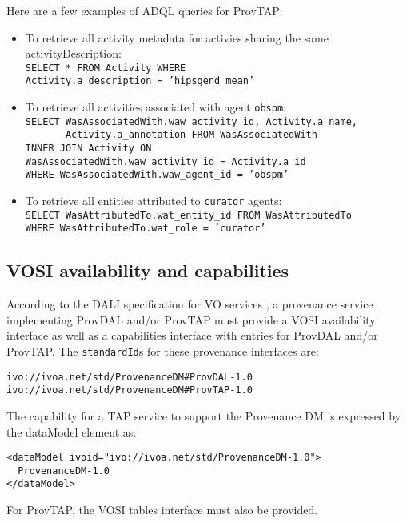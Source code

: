 Here are a few examples of ADQL queries for ProvTAP:
\begin{itemize}
\item To retrieve all activity metadata for activies sharing the same activityDescription: \\
\texttt{SELECT * FROM  Activity WHERE \\
  Activity.a\_description = 'hipsgend\_mean'}
\item To retrieve all activities associated with agent \texttt{obspm}: \\
\texttt{SELECT WasAssociatedWith.waw\_activity\_id, Activity.a\_name, \\}
\verb!       !\texttt{Activity.a\_annotation FROM WasAssociatedWith \\
INNER JOIN Activity ON \\ WasAssociatedWith.waw\_activity\_id = Activity.a\_id
\\ WHERE  WasAssociatedWith.waw\_agent\_id = 'obspm'}
\item To retrieve all entities attributed to \texttt{curator} agents: \\
\texttt{SELECT WasAttributedTo.wat\_entity\_id FROM WasAttributedTo \\
 WHERE WasAttributedTo.wat\_role = 'curator'}
\end{itemize}


\subsection{VOSI availability and capabilities}
According to the DALI specification for VO services \citep{std:DALI}, a provenance service implementing ProvDAL and/or ProvTAP must provide a VOSI availability interface as well as a capabilities interface with entries for ProvDAL and/or ProvTAP. The \texttt{standardId}s for these provenance interfaces are:

\begin{verbatim}
ivo://ivoa.net/std/ProvenanceDM#ProvDAL-1.0
ivo://ivoa.net/std/ProvenanceDM#ProvTAP-1.0
\end{verbatim}

The capability for a TAP service to support the Provenance DM is expressed by
the dataModel element as:
\begin{verbatim}
<dataModel ivoid="ivo://ivoa.net/std/ProvenanceDM-1.0">
  ProvenanceDM-1.0
</dataModel>
\end{verbatim}

For ProvTAP, the VOSI tables interface must also be provided.

